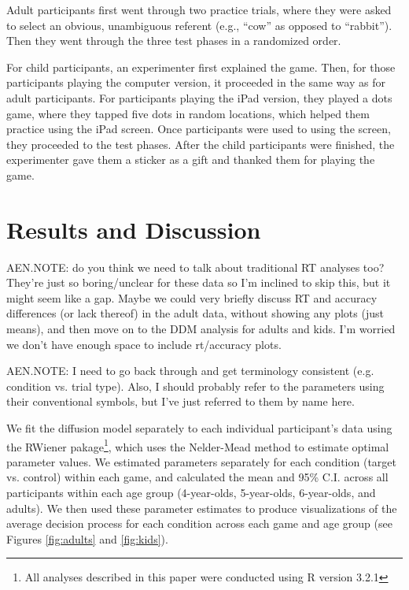 \documentclass[10pt,letterpaper]{article}
\begin{document}
Adult participants first went through two practice trials, where they were asked to select an obvious, unambiguous referent (e.g., ``cow'' as opposed to ``rabbit''). Then they went through the three test phases in a randomized order.

For child participants, an experimenter first explained the game. Then, for those participants playing the computer version, it proceeded in the same way as for adult participants. For participants playing the iPad version, they played a dots game, where they tapped five dots in random locations, which helped them practice using the iPad screen. Once participants were used to using the screen, they proceeded to the test phases. After the child participants were finished, the experimenter gave them a sticker as a gift and thanked them for playing the game.

\section{Results and Discussion}
AEN.NOTE: do you think we need to talk about traditional RT analyses too?  They're just so boring/unclear for these data so I'm inclined to skip this, but it might seem like a gap.  Maybe we could very briefly discuss RT and accuracy differences (or lack thereof) in the adult data, without showing any plots (just means), and then move on to the DDM analysis for adults and kids.  I'm worried we don't have enough space to include rt/accuracy plots.

AEN.NOTE: I need to go back through and get terminology consistent (e.g. condition vs. trial type).  Also, I should probably refer to the parameters using their conventional symbols, but I've just referred to them by name here.  

We fit the diffusion model separately to each individual participant's data using the RWiener pakage\footnote{All analyses described in this paper were conducted using R version 3.2.1}, which uses the Nelder-Mead method to estimate optimal parameter values.  We estimated parameters separately for each condition (target vs. control) within each game, and calculated the mean and 95\% C.I. across all participants within each age group (4-year-olds, 5-year-olds, 6-year-olds, and adults).  We then used these parameter estimates to produce visualizations of the average decision process for each condition across each game and age group (see Figures \ref{fig:adults} and \ref{fig:kids}).  
\end{document}
